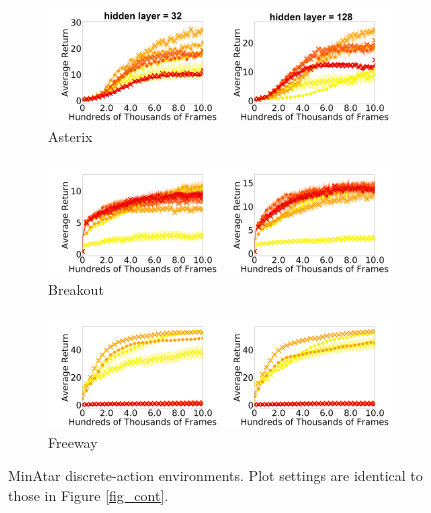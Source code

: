 \documentclass[\main/thesis.tex]{subfiles}
\begin{document}
\begin{figure}[!htb]
  \centering
  \begin{subfigure}[b]{1\linewidth}
    \centering
    \includegraphics[width=\columnwidth]{figs/deep/discrete/asterix_combined.png} 
    \caption{Asterix
    }\label{fig:asterix}
  \end{subfigure}%
  
  \begin{subfigure}[b]{1\linewidth}
    \centering
    \includegraphics[width=\columnwidth]{figs/deep/discrete/breakout_combined.png} 
    \caption{Breakout
    }\label{fig:breakout}
  \end{subfigure}%
  
  \begin{subfigure}[b]{1\linewidth}
    \centering
    \includegraphics[width=\columnwidth]{figs/deep/discrete/freeway_combined.png} 
    \caption{Freeway
    }\label{fig:freeway}
  \end{subfigure}%
  \caption{MinAtar discrete-action environments. Plot settings are identical to those in Figure \ref{fig_cont}. }\label{fig:minatar}
\end{figure}
\end{document}
